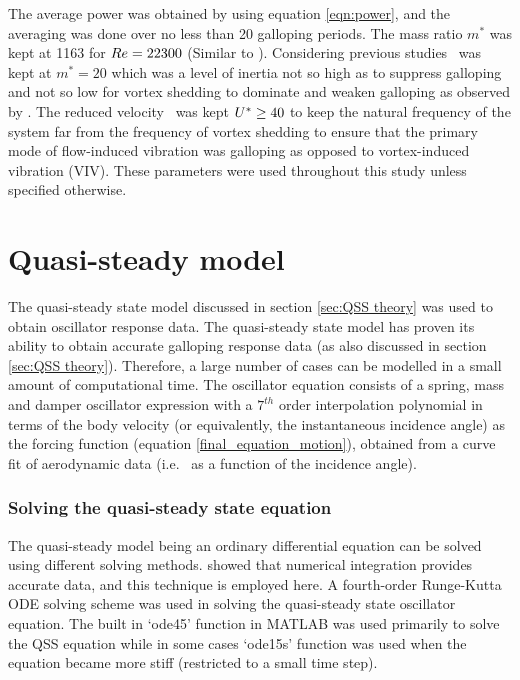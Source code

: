 The average power was obtained by using equation \ref{eqn:power}, and the averaging was done over no less than 20 galloping periods. The mass ratio $m^*$ was kept at 1163 for $Re=22300$ (Similar to \citet{Parkinson1964}). Considering previous studies \citep{Robertson2003,Joly2012} \mstar\ was kept at $m^*=20$ which was a level of inertia not so high as to suppress galloping and not so low for vortex shedding to dominate and weaken galloping as observed by \citet{Joly2012}. The reduced velocity \ustar\ was kept $U^{*}\geq 40$ to keep the natural frequency of the system far from the frequency of vortex shedding to ensure that the primary mode of flow-induced vibration was galloping as opposed to vortex-induced vibration (VIV). These parameters were used throughout this study unless specified otherwise.

\section{Quasi-steady model}
\label{sec:QSS_model_methodology}

The quasi-steady state model discussed in section \ref{sec:QSS theory} was used to obtain oscillator response data. The quasi-steady state model has proven its ability to obtain accurate galloping response data (as also discussed in section \ref{sec:QSS theory}). Therefore, a large number of cases can be modelled in a small amount of computational time. The oscillator equation consists of a spring, mass and damper oscillator expression with a $7^{th}$ order interpolation polynomial in terms of the body velocity (or equivalently, the instantaneous incidence angle) as the forcing function (equation \ref{final_equation_motion}), obtained from a curve fit of aerodynamic data (i.e. \cy\ as a function of the incidence angle).

\subsubsection{Solving the quasi-steady state equation}

The quasi-steady model being an ordinary differential equation can be solved using different solving methods. \citet{Vio2007} showed that numerical integration provides accurate data, and this technique is employed here. A fourth-order Runge-Kutta ODE solving scheme was used in solving the quasi-steady state oscillator equation. The built in `ode45' function in MATLAB was used primarily to solve the QSS equation while in some cases `ode15s' function was used when the equation became more stiff (restricted to a small time step).


